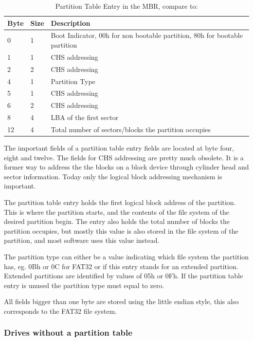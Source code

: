 \begin{table}[ht]
\caption{Partition Table Entry in the MBR, compare to: \cite{usb_ms_jan}}
\centering
\begin{tabular}{|l|l|l|}
\hline\hline
\textbf{Byte} & \textbf{Size} & \textbf{Description}\\ \hline
0 & 1 & Boot Indicator, 00h for non bootable partition, 80h for bootable partition \\ \hline
1 & 1 & CHS addressing \\ \hline
2 & 2 & CHS addressing \\ \hline
4 & 1 & Partition Type \\ \hline
5 & 1 & CHS addressing \\ \hline
6 & 2 & CHS addressing \\ \hline
8 & 4 & LBA of the first sector \\ \hline
12 & 4 & Total number of sectors/blocks the partition occupies \\ \hline
\end{tabular}
\label{table:mbr_entry}
\end{table}

The important fields of a partition table entry fields are located at byte four, eight and twelve. The fields for CHS addressing are pretty much obsolete. It is a former way to address the the blocks on a block device through cylinder head and sector information. Today only the logical block addressing mechanism is important.

The partition table entry holds the first logical block address of the partition. This is where the partition starts, and the contents of the file system of the desired partition begin. The entry also holds the total number of blocks the partition occupies, but mostly this value is also stored in the file system of the partition, and most software uses this value instead\cite{usb_ms_jan}.

The partition type can either be a value indicating which file system the partition has, eg. 0Bh or 0C for FAT32 or if this entry stands for an extended partition. Extended partitions are identified by values of 05h or 0Fh. If the partition table entry is unused the partition type must equal to zero\cite{usb_ms_jan}.

All fields bigger than one byte are stored using the little endian style, this also corresponds to the FAT32 file system.

\subsubsection{Drives without a partition table}

